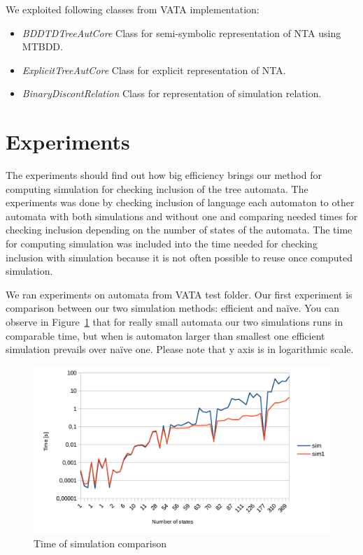 \documentclass[a4paper, 12pt]{article}
\begin{document}
We exploited following classes from VATA implementation:

\begin{itemize}
	\item \emph{BDDTDTreeAutCore} Class for semi-symbolic representation of NTA using MTBDD.
	\item \emph{ExplicitTreeAutCore} Class for explicit representation of NTA.
	\item \emph{BinaryDiscontRelation} Class for representation of simulation relation.
\end{itemize}

\section{Experiments}
\label{sec:exps}

The experiments should find out how big efficiency brings our method for computing simulation for checking inclusion of the tree automata.
The experiments was done by checking inclusion of language each automaton to other automata with both simulations and without one
and comparing needed times for checking inclusion depending on the number of states of the automata.
The time for computing simulation was included into the time needed for checking inclusion with simulation
because it is not often possible to reuse once computed simulation.

We ran experiments on automata from VATA test folder. Our first experiment is comparison between our two simulation methods: efficient and na{\"i}ve. You can observe in Figure~\ref{fig:g_simulation} that for really small automata our two simulations runs in comparable time, but when is automaton larger than smallest one efficient simulation prevails over na{\"i}ve one. Please note that y axis is in logarithmic scale.

\begin{figure}[h!]
\centering
\includegraphics{g_simulation}
\caption{Time of simulation comparison}
\label{fig:g_simulation}
\end{figure}
\end{document}
